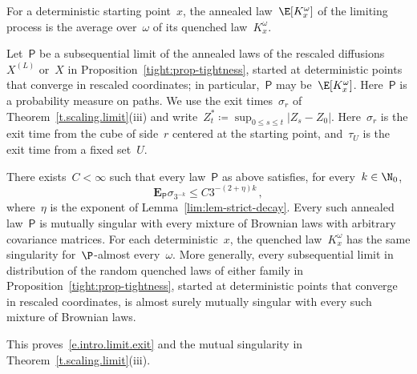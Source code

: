\documentclass[11pt]{amsart}
\begin{document}
\smallskip

For a deterministic starting point~$x$, the annealed law~$\E[K_x^\omega]$ of the limiting process is the average over~$\omega$ of its quenched law~$K_x^\omega$.

\smallskip

Let~$\mathsf P$ be a subsequential limit of the annealed laws of the rescaled diffusions~$X^{(L)}$ or~$X$ in Proposition~\ref{tight:prop-tightness}, started at deterministic points that converge in rescaled coordinates; in particular,~$\mathsf P$ may be~$\E[K_x^\omega]$. Here~$\mathsf P$ is a probability measure on paths. We use the exit times~$\sigma_r$ of Theorem~\ref{t.scaling.limit}(iii) and write~$Z^*_t\coloneqq\sup_{0\leq s\leq t}|Z_s-Z_0|$. Here~$\sigma_r$ is the exit time from the cube of side~$r$ centered at the starting point, and~$\tau_U$ is the exit time from a fixed set~$U$.

\begin{theorem}
\label{lim:thm-nonbrownian}
There exists~$C<\infty$ such that every law~$\mathsf P$ as above satisfies, for every~$k\in\N_0$,
\begin{equation}
	\mathbf E_{\mathsf P}\sigma_{3^{-k}}\leq C3^{-(2+\eta)k}\,,
	\label{lim:eq-limit-exits}
\end{equation}
where~$\eta$ is the exponent of Lemma~\ref{lim:lem-strict-decay}. Every such annealed law~$\mathsf P$ is mutually singular with every mixture of Brownian laws with arbitrary covariance matrices. For each deterministic~$x$, the quenched law~$K_x^\omega$ has the same singularity for~$\P$-almost every~$\omega$. More generally, every subsequential limit in distribution of the random quenched laws of either family in Proposition~\ref{tight:prop-tightness}, started at deterministic points that converge in rescaled coordinates, is almost surely mutually singular with every such mixture of Brownian laws.
\end{theorem}

This proves~\eqref{e.intro.limit.exit} and the mutual singularity in Theorem~\ref{t.scaling.limit}(iii).
\end{document}
